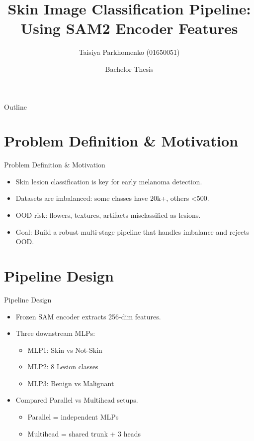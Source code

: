\documentclass[aspectratio=169]{beamer}
\title[Skin Image Classification]{Skin Image Classification Pipeline:\\Using SAM2 Encoder Features}
\author{Taisiya Parkhomenko (01650051)}
\date{Bachelor Thesis}
\institute{Institute of Visual Computing (IVC)}
\begin{document}
\begin{frame}[plain]
  \maketitle
\end{frame}


\begin{frame}{Outline}
  \tableofcontents
\end{frame}


\section{Problem Definition \& Motivation}

\begin{frame}{Problem Definition \& Motivation}
  \begin{itemize}
    \item Skin lesion classification is key for early melanoma detection.
    \item Datasets are imbalanced: some classes have 20k+, others <500.
    \item OOD risk: flowers, textures, artifacts misclassified as lesions.
    \item Goal: Build a robust multi-stage pipeline that handles imbalance and rejects OOD.
  \end{itemize}
  \vspace{0.5em}
\end{frame}


\section{Pipeline Design}

\begin{frame}{Pipeline Design}
  \begin{itemize}
    \item Frozen SAM encoder extracts 256-dim features.
    \item Three downstream MLPs:
      \begin{itemize}
        \item MLP1: Skin vs Not-Skin
        \item MLP2: 8 Lesion classes
        \item MLP3: Benign vs Malignant
      \end{itemize}
    \item Compared Parallel vs Multihead setups.
      \begin{itemize}
        \item Parallel = independent MLPs
        \item Multihead = shared trunk + 3 heads
      \end{itemize}
  \end{itemize}
\end{frame}
\end{document}
